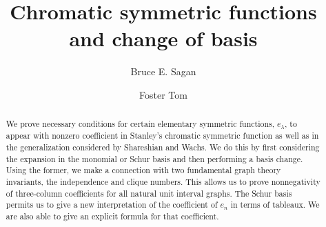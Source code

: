 \documentclass[12pt]{amsart}  %
\theoremstyle{definition}
\theoremstyle{remark}
\numberwithin{equation}{section}
\newcommand{\la}{\lambda}
\begin{document}
\title[Chromatic symmetric functions and change of basis]{Chromatic symmetric functions and change of basis}


\author{Bruce E. Sagan}
\address{Department of Mathematics, Michigan State University, East Lansing, MI 48824}

\author{Foster Tom}
\address{Department of Mathematics, Massachusetts Institute of Technology, Cambridge, MA 02139}




\begin{abstract}
We prove necessary conditions for certain elementary symmetric functions, $e_\la$, to appear with nonzero coefficient in Stanley's chromatic symmetric function as well as in the generalization considered by Shareshian and Wachs. We do this by first considering the expansion in the monomial or Schur basis and then performing a basis change.
Using the former, we make a connection with two fundamental graph theory invariants, the independence and clique numbers.
This allows us to prove nonnegativity of three-column coefficients for all natural unit interval graphs. The Schur basis permits us to give 
a new interpretation of the coefficient of $e_n$ in terms of tableaux.  We are also able to give an explicit formula for that coefficient.
\end{abstract}

\maketitle
\end{document}
